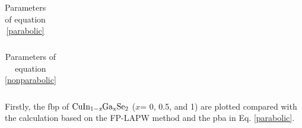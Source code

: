 \documentclass[a4paper, 12pt, titlepage,oneside,drop]{kthesis}
\begin{document}
\begin{table}[ht]
\caption{Parameters of equation \ref{parabolic}}
\begin{center}
\begin{tabular}{ccc}
\end{tabular}
\end{center}
\label{rd1}
\end{table}

\begin{table}[ht]
\caption{Parameters of equation \ref{nonparabolic}}
\begin{center}
\begin{tabular}{ccc}
\end{tabular}
\end{center}
\label{rd2}
\end{table}


 \newpage

Firstly, the fbp of $\mathrm { CuIn_{1-\textit{x}}Ga_{x}Se_2}$ ($x$= 0, 0.5, and 1) are plotted compared with the calculation based on the FP-LAPW method and the pba in 
Eq. \ref{parabolic}.
\end{document}
